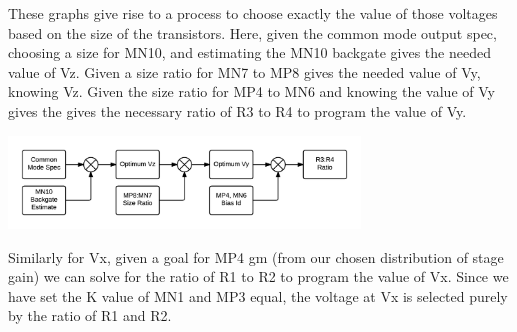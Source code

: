 \documentclass[12pt,a4paper]{article}
\begin{document}
\begin{figure}[H]
	\footnotesize
	\hfill
\end{figure}


These graphs give rise to a process to choose exactly the value of those voltages based on the size of the transistors.
Here, given the common mode output spec, choosing a size for MN10, and estimating the MN10 backgate gives the needed value of Vz.
Given a size ratio for MN7 to MP8 gives the needed value of Vy, knowing Vz.
Given the size ratio for MP4 to MN6 and knowing the value of Vy gives the gives the necessary ratio of R3 to R4 to program the value of Vy.

{\centering
	\includegraphics[width=0.7\textwidth]{flowchart_common_mode.png}\par
}

Similarly for Vx, given a goal for MP4 gm (from our chosen distribution of stage gain) we can solve for the ratio of R1 to R2 to program the value of Vx.
Since we have set the K value of MN1 and MP3 equal, the voltage at Vx is selected purely by the ratio of R1 and R2.
\end{document}
